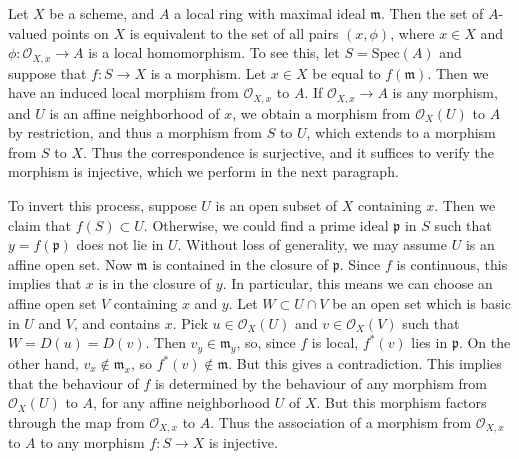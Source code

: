 \begin{example}
    Let $X$ be a scheme, and $A$ a local ring with maximal ideal $\mathfrak{m}$. Then the set of $A$-valued points on $X$ is equivalent to the set of all pairs $(x,\phi)$, where $x \in X$ and $\phi: \mathcal{O}_{X,x} \to A$ is a local homomorphism. To see this, let $S = \text{Spec}(A)$ and suppose that $f: S \to X$ is a morphism. Let $x \in X$ be equal to $f(\mathfrak{m})$. Then we have an induced local morphism from $\mathcal{O}_{X,x}$ to $A$. If $\mathcal{O}_{X,x} \to A$ is any morphism, and $U$ is an affine neighborhood of $x$, we obtain a morphism from $\mathcal{O}_X(U)$ to $A$ by restriction, and thus a morphism from $S$ to $U$, which extends to a morphism from $S$ to $X$. Thus the correspondence is surjective, and it suffices to verify the morphism is injective, which we perform in the next paragraph.

    To invert this process, suppose $U$ is an open subset of $X$ containing $x$. Then we claim that $f(S) \subset U$. Otherwise, we could find a prime ideal $\mathfrak{p}$ in $S$ such that $y = f(\mathfrak{p})$ does not lie in $U$. Without loss of generality, we may assume $U$ is an affine open set. Now $\mathfrak{m}$ is contained in the closure of $\mathfrak{p}$. Since $f$ is continuous, this implies that $x$ is in the closure of $y$. In particular, this means we can choose an affine open set $V$ containing $x$ and $y$. Let $W \subset U \cap V$ be an open set which is basic in $U$ and $V$, and contains $x$. Pick $u \in \mathcal{O}_X(U)$ and $v \in \mathcal{O}_X(V)$ such that $W = D(u) = D(v)$. Then $v_y \in \mathfrak{m}_y$, so, since $f$ is local, $f^*(v)$ lies in $\mathfrak{p}$. On the other hand, $v_x \not \in \mathfrak{m}_x$, so $f^*(v) \not \in \mathfrak{m}$. But this gives a contradiction. This implies that the behaviour of $f$ is determined by the behaviour of any morphism from $\mathcal{O}_X(U)$ to $A$, for any affine neighborhood $U$ of $X$. But this morphism factors through the map from $\mathcal{O}_{X,x}$ to $A$. Thus the association of a morphism from $\mathcal{O}_{X,x}$ to $A$ to any morphism $f: S \to X$ is injective.
\end{example}

